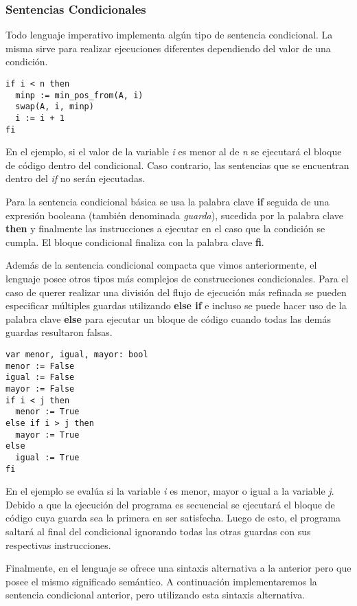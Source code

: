 \documentclass{article}
\begin{document}
\subsubsection{Sentencias Condicionales}

Todo lenguaje imperativo implementa algún tipo de sentencia condicional.
La misma sirve para realizar ejecuciones diferentes dependiendo del valor de una condición.

\begin{lstlisting}
if i < n then
  minp := min_pos_from(A, i)
  swap(A, i, minp)
  i := i + 1
fi
\end{lstlisting}

En el ejemplo, si el valor de la variable \textit{i} es menor al de \textit{n} se ejecutará el bloque de código dentro del condicional.
Caso contrario, las sentencias que se encuentran dentro del \textit{if} no serán ejecutadas.

Para la sentencia condicional básica se usa la palabra clave \textbf{if} seguida de una expresión booleana (también denominada \textit{guarda}), sucedida por la palabra clave \textbf{then} y finalmente las instrucciones a ejecutar en el caso que la condición se cumpla.
El bloque condicional finaliza con la palabra clave \textbf{fi}.

Además de la sentencia condicional compacta que vimos anteriormente, el lenguaje posee otros tipos más complejos de construcciones condicionales.
Para el caso de querer realizar una división del flujo de ejecución más refinada se pueden especificar múltiples guardas utilizando \textbf{else if} e incluso se puede hacer uso de la palabra clave \textbf{else} para ejecutar un bloque de código cuando todas las demás guardas resultaron falsas.

\begin{lstlisting}
var menor, igual, mayor: bool
menor := False
igual := False
mayor := False
if i < j then
  menor := True
else if i > j then
  mayor := True
else
  igual := True
fi
\end{lstlisting}

En el ejemplo se evalúa si la variable \textit{i} es menor, mayor o igual a la variable \textit{j}.
Debido a que la ejecución del programa es secuencial se ejecutará el bloque de código cuya guarda sea la primera en ser satisfecha.
Luego de esto, el programa saltará al final del condicional ignorando todas las otras guardas con sus respectivas instrucciones.

Finalmente, en el lenguaje se ofrece una sintaxis alternativa a la anterior pero que posee el mismo significado semántico.
A continuación implementaremos la sentencia condicional anterior, pero utilizando esta sintaxis alternativa.
\end{document}
